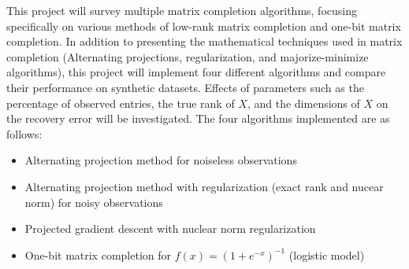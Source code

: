 This project will survey multiple matrix completion algorithms, focusing specifically on various methods of low-rank matrix completion and one-bit matrix completion. In addition to presenting the mathematical techniques used in matrix completion (Alternating projections, regularization, and majorize-minimize algorithms), this project will implement four different algorithms and compare their performance on synthetic datasets. Effects of parameters such as the percentage of observed entries, the true rank of $X$, and the dimensions of $X$ on the recovery error will be investigated. The four algorithms implemented are as follows:
\begin{itemize}
    \item Alternating projection method for noiseless observations 
    \item Alternating projection method with regularization (exact rank and nucear norm) for noisy observations 
    \item Projected gradient descent with nuclear norm regularization 
    \item One-bit matrix completion for $f(x) = (1 + e^{-x})^{-1}$ (logistic model)
\end{itemize}
